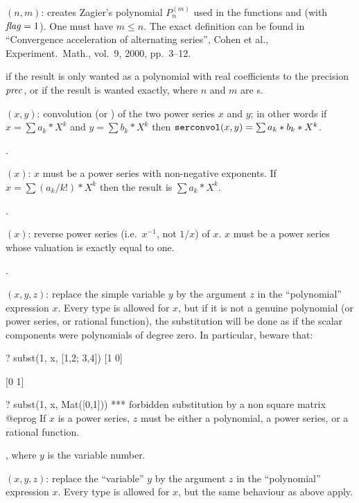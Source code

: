 $(n,m)$: creates Zagier's polynomial $P_n^{(m)}$ used in
the functions  and  (with $\hbox{\it f\kern0pt lag\/}=1$). One must have $m\le
n$. The exact definition can be found in ``Convergence acceleration of
alternating series'', Cohen et al., Experiment.~Math., vol.~9, 2000, pp.~3--12.


 if the result is only wanted as a polynomial
with real coefficients to the precision $\hbox{\it prec\/}$, or 
if the result is wanted exactly, where $n$ and $m$ are s.

$(x,y)$: convolution (or ) of the
two power series $x$ and $y$; in other words if $x=\sum a_k*X^k$ and $y=\sum
b_k*X^k$ then ${\tt serconvol}(x,y)=\sum a_k*b_k*X^k$.

.

$(x)$: $x$ must be a power series with non-negative
exponents. If $x=\sum (a_k/k!)*X^k$ then the result is $\sum a_k*X^k$.

.

$(x)$: reverse power series (i.e.~$x^{-1}$, not $1/x$)
of $x$. $x$ must be a power series whose valuation is exactly equal to one.

.

$(x,y,z)$:
replace the simple variable $y$ by the argument $z$ in the ``polynomial''
expression $x$. Every type is allowed for $x$, but if it is not a genuine
polynomial (or power series, or rational function), the substitution will be
done as if the scalar components were polynomials of degree zero. In
particular, beware that:

\bprog
? subst(1, x, [1,2; 3,4])
[1 0]

[0 1]

? subst(1, x, Mat([0,1]))
  ***   forbidden substitution by a non square matrix
@eprog\noindent
If $x$ is a power series, $z$ must be either a polynomial, a power
series, or a rational function.

, where $y$ is the variable number.

$(x,y,z)$:
replace the ``variable'' $y$ by the argument $z$ in the ``polynomial''
expression $x$. Every type is allowed for $x$, but the same behaviour
as  above apply.

